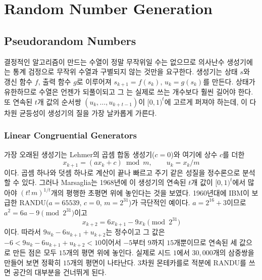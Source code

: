 \chapter{Random Number Generation}
\label{ch:random-numbers}


\section{Pseudorandom Numbers}
\label{sec:pseudo-random}

결정적인 알고리즘이 만드는 수열이 정말 무작위일 수는 없으므로 의사난수 생성기에는 통계 검정으로 무작위 수열과 구별되지 않는 것만을 요구한다. 생성기는 상태 $s$와 갱신 함수 $f$, 출력 함수 $g$로 이루어져 $s_{k+1}=f(s_k)$, $u_k=g(s_k)$를 만든다. 상태가 유한하므로 수열은 언젠가 되풀이되고 그 는 실제로 쓰는 개수보다 훨씬 길어야 한다. 또 연속된 $t$개 값의 순서쌍 $(u_k,\dots,u_{k+t-1})$이 $[0,1)^t$에 고르게 퍼져야 하는데, 이 다차원 균등성이 생성기의 질을 가장 날카롭게 가른다.

\subsection{Linear Congruential Generators}

가장 오래된 생성기는 Lehmer의 곱셈 합동 생성기($c=0$)\cite{lehmer1951}와 여기에 상수 $c$를 더한 
\[
x_{k+1}=(ax_k+c)\bmod m,\qquad u_k=x_k/m
\]
이다. 곱셈 하나와 덧셈 하나로 계산이 끝나 빠르고 주기 같은 성질을 정수론으로 분석할 수 있다\cite{knuth1997taocp2}. 그러나 Marsaglia는 1968년에 이 생성기의 연속된 $t$개 값이 $[0,1)^t$에서 많아야 $(t!\,m)^{1/t}$개의 평행한 초평면 위에 놓인다는 것을 보였다\cite{marsaglia1968}. 1960년대에 IBM이 보급한 RANDU($a=65539$, $c=0$, $m=2^{31}$)가 극단적인 예이다. $a=2^{16}+3$이므로 $a^2=6a-9\pmod{2^{31}}$이고
\[
x_{k+2}=6x_{k+1}-9x_k\pmod{2^{31}}
\]
이다. 따라서 $9u_k-6u_{k+1}+u_{k+2}$는 정수이고 그 값은 $-6<9u_k-6u_{k+1}+u_{k+2}<10$이어서 $-5$부터 $9$까지 $15$개뿐이므로 연속된 세 값으로 만든 점은 모두 $15$개의 평면 위에 놓인다. 실제로 시드 $1$에서 $30{,}000$개의 삼중쌍을 만들어 보면 정확히 $15$개의 평면이 나타난다. 3차원 몬테카를로 적분에 RANDU를 쓰면 공간의 대부분을 건너뛰게 된다.


